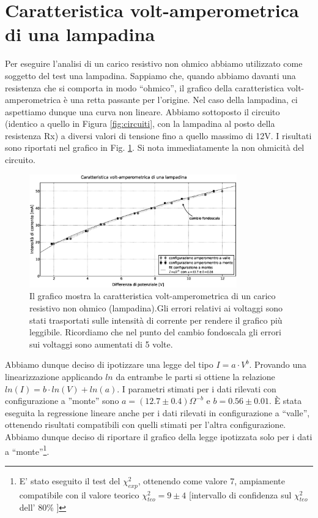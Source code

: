 \section{Caratteristica volt-amperometrica di una lampadina}
Per eseguire l'analisi di un carico resistivo non ohmico abbiamo utilizzato come soggetto del test una lampadina. Sappiamo che, quando abbiamo davanti una resistenza che si comporta in modo ``ohmico'', il grafico della caratteristica volt-amperometrica è una retta passante per l'origine. Nel caso della lampadina, ci aspettiamo dunque una curva non lineare. Abbiamo sottoposto il circuito (identico a quello in Figura \ref{fig:circuiti}, con la lampadina al posto della resistenza Rx) a diversi valori di tensione fino a quello massimo di 12V. I risultati sono riportati nel grafico in Fig. \ref{fig:lampadina}. Si nota immediatamente la non ohmicità del circuito.

\begin{figure}[h]
    \centering
        \includegraphics[width=0.8\textwidth]{lamp.eps}
        \caption{Il grafico mostra la caratteristica volt-amperometrica di un carico resistivo non ohmico (lampadina).Gli errori relativi ai voltaggi sono stati trasportati sulle intensità di corrente per rendere il grafico più leggibile. Ricordiamo che nel punto del cambio fondoscala gli errori sui voltaggi sono aumentati di 5 volte.} 
        \label{fig:lampadina}
\end{figure}


Abbiamo dunque deciso di ipotizzare una legge del tipo $I=a \cdot V^{b}$. Provando una linearizzazione applicando $ln$ da entrambe le parti si ottiene la relazione $ln(I)=b \cdot ln(V) + ln(a)$.  I parametri stimati per i dati rilevati con configurazione a ''monte'' sono $a=(12.7\pm 0.4)\Omega^{-b}$ e $b=0.56 \pm 0.01$. È stata eseguita la regressione lineare anche per i dati rilevati in configurazione a ``valle'', ottenendo risultati compatibili con quelli stimati per l'altra configurazione. Abbiamo dunque deciso di riportare il grafico della legge ipotizzata solo per i dati a ``monte''\footnote{E' stato eseguito il test del $\chi ^2_{exp}$, ottenendo come valore 7, ampiamente compatibile con il valore teorico $\chi ^2_{teo}=9 \pm 4$ [intervallo di confidenza sul $\chi ^2_{teo}$ dell' 80\% ] }.

